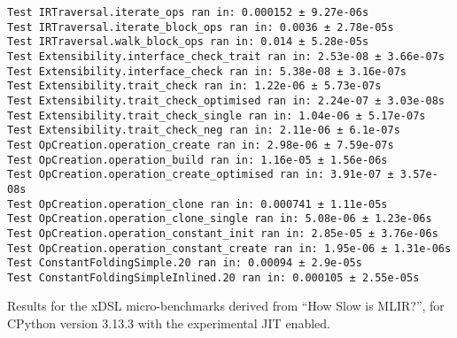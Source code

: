\begin{code}
    \begin{verbatim}
Test IRTraversal.iterate_ops ran in: 0.000152 ± 9.27e-06s
Test IRTraversal.iterate_block_ops ran in: 0.0036 ± 2.78e-05s
Test IRTraversal.walk_block_ops ran in: 0.014 ± 5.28e-05s
Test Extensibility.interface_check_trait ran in: 2.53e-08 ± 3.66e-07s
Test Extensibility.interface_check ran in: 5.38e-08 ± 3.16e-07s
Test Extensibility.trait_check ran in: 1.22e-06 ± 5.73e-07s
Test Extensibility.trait_check_optimised ran in: 2.24e-07 ± 3.03e-08s
Test Extensibility.trait_check_single ran in: 1.04e-06 ± 5.17e-07s
Test Extensibility.trait_check_neg ran in: 2.11e-06 ± 6.1e-07s
Test OpCreation.operation_create ran in: 2.98e-06 ± 7.59e-07s
Test OpCreation.operation_build ran in: 1.16e-05 ± 1.56e-06s
Test OpCreation.operation_create_optimised ran in: 3.91e-07 ± 3.57e-08s
Test OpCreation.operation_clone ran in: 0.000741 ± 1.11e-05s
Test OpCreation.operation_clone_single ran in: 5.08e-06 ± 1.23e-06s
Test OpCreation.operation_constant_init ran in: 2.85e-05 ± 3.76e-06s
Test OpCreation.operation_constant_create ran in: 1.95e-06 ± 1.31e-06s
Test ConstantFoldingSimple.20 ran in: 0.00094 ± 2.9e-05s
Test ConstantFoldingSimpleInlined.20 ran in: 0.000105 ± 2.55e-05s
    \end{verbatim}
    \caption{Results for the xDSL micro-benchmarks derived from ``How Slow is MLIR?'', for CPython version 3.13.3 with the experimental JIT enabled.}
    \label{listing:how-slow-is-mlir-xdsl-microbenchmark-results-313jit}
\end{code}
